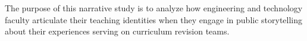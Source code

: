 The purpose of this narrative study is to analyze how engineering and technology faculty articulate their teaching identities when they engage in public storytelling about their experiences serving on curriculum revision teams.
